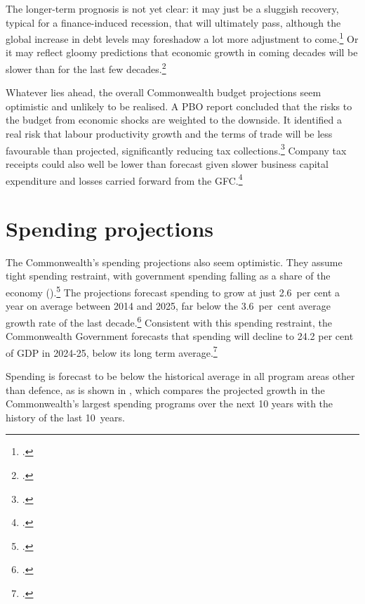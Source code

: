 \documentclass[twoside,english]{palatinob5portrait}
\begin{document}
The longer-term prognosis is not yet clear:  it may just be a sluggish recovery, typical for a finance-induced recession, that will ultimately pass,  although the global increase in debt levels may foreshadow a lot more adjustment to come.\footcites{BailyBosworth2013}{RoxburghLundWimmerEtAl2011} Or it may reflect gloomy predictions that economic growth in coming decades will be slower than for the last few decades.\footcite[][footnote~23]{RoxburghLundWimmerEtAl2011} 

Whatever lies ahead, the overall Commonwealth budget projections seem optimistic and unlikely to be realised. A PBO report concluded that the risks to the budget from economic shocks are weighted to the downside. It identified a real risk that labour productivity growth and the terms of trade will be less favourable than projected, significantly reducing tax collections.\footcite{PBO2014TrendsAustralianGovtReceipts1982to2013}  Company tax receipts could also well be lower than forecast given slower business capital expenditure  and losses carried forward from the GFC.\footcite[][38--44]{RBA2015a}

\section{Spending projections}
The Commonwealth’s spending projections also seem optimistic. They assume tight spending restraint, with government spending falling as a share of the economy ().\footcite[][5--11]{Treasury2015BudgetPapers201516}  The projections forecast spending to grow at just 2.6~per cent a year on average between 2014 and 2025, far below the 3.6~per~cent average growth rate of the last decade.\footcite[][5]{PBO2015}  Consistent with this spending restraint, the Commonwealth Government forecasts that spending will decline to 24.2 per cent of GDP in 2024-25, below its long term average.\footcite[][3--9]{Treasury2015BudgetPapers201516}  

Spending is forecast to be below the historical average in all program areas other than defence, as is shown in , which compares the projected growth in the Commonwealth’s largest spending programs over the next 10 years with the history of the last 10~years. 
\end{document}
